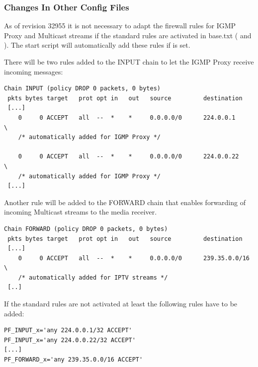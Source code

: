 \subsubsection{Changes In Other Config Files}

As of revision 32955 it is not necessary to adapt the firewall rules for
IGMP Proxy and Multicast streams if the standard rules are activated in
base.txt ( and ).
The start script will automatically add these rules if  is set.

There will be two rules added to the INPUT chain to let the IGMP Proxy
receive incoming messages:

\begin{example}
\begin{verbatim}
Chain INPUT (policy DROP 0 packets, 0 bytes)
 pkts bytes target   prot opt in   out   source         destination
 [...]
    0     0 ACCEPT   all  --  *    *     0.0.0.0/0      224.0.0.1     \
    /* automatically added for IGMP Proxy */

    0     0 ACCEPT   all  --  *    *     0.0.0.0/0      224.0.0.22    \
    /* automatically added for IGMP Proxy */
 [...]
\end{verbatim}
\end{example}

Another rule will be added to the FORWARD chain that enables forwarding of
incoming Multicast streams to the media receiver.

\begin{example}
\begin{verbatim}
Chain FORWARD (policy DROP 0 packets, 0 bytes)
 pkts bytes target   prot opt in   out   source         destination
 [...]
    0     0 ACCEPT   all  --  *    *     0.0.0.0/0      239.35.0.0/16  \
    /* automatically added for IPTV streams */
 [..]
\end{verbatim}
\end{example}

If the standard rules are not activated at least the following rules have to be added:

\begin{example}
\begin{verbatim}
PF_INPUT_x='any 224.0.0.1/32 ACCEPT'
PF_INPUT_x='any 224.0.0.22/32 ACCEPT'
[...]
PF_FORWARD_x='any 239.35.0.0/16 ACCEPT'
\end{verbatim}
\end{example}

